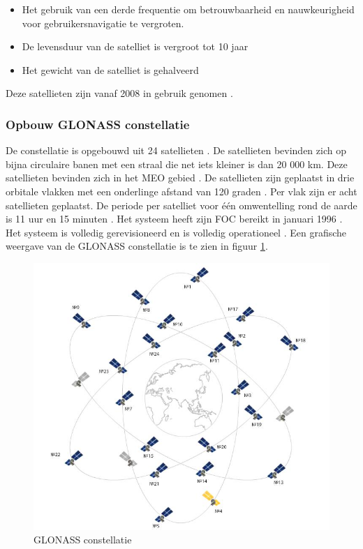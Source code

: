 \begin{itemize}
	\item Het gebruik van een derde frequentie om betrouwbaarheid en nauwkeurigheid voor gebruikersnavigatie te vergroten.
	\item De levensduur van de satelliet is vergroot tot 10 jaar
	\item Het gewicht van de satelliet is gehalveerd
\end{itemize}
Deze satellieten zijn vanaf 2008 in gebruik genomen \cite{LBibPPP}.

\subsubsection{Opbouw GLONASS constellatie} 
De constellatie is opgebouwd uit 24 satellieten \cite{LBibGNSS4}. De satellieten bevinden zich op bijna circulaire banen met een straal die net iets kleiner is dan 20 000 km. Deze satellieten bevinden zich in het MEO gebied \cite{LBibMEO}. De satellieten zijn geplaatst in drie orbitale vlakken met een onderlinge afstand van 120 graden \cite{LBibGLONASS2,LBibGNSS6, LBibGNSS8}. Per vlak zijn er acht satellieten geplaatst. De periode per satelliet voor \'e\'en omwentelling rond de aarde is 11 uur en 15 minuten \cite{LBibGNSS6}.  Het systeem heeft zijn FOC bereikt in januari 1996 \cite{LBibGLONASS}. Het systeem is volledig gerevisioneerd en is volledig operationeel \cite{LBibGNSS4}. Een grafische weergave van de GLONASS constellatie is te zien in figuur \ref{imgGLONASS}.

\begin{figure}[h!]
	\includegraphics[scale=0.44]{GLONASS.jpg}
	\centering
	\caption{GLONASS constellatie \cite{LImgGLONASS}}
	\label{imgGLONASS}
\end{figure}

